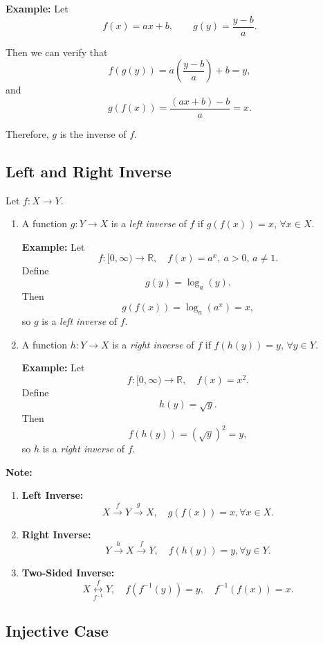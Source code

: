 \documentclass[12pt,a4paper,openany]{article}
\begin{document}
\textbf{Example:}  
Let
\[
f(x) = a x + b, \qquad g(y) = \frac{y - b}{a}.
\]

Then we can verify that
\[
f(g(y)) = a \left( \frac{y - b}{a} \right) + b = y,
\]
and
\[
g(f(x)) = \frac{(a x + b) - b}{a} = x.
\]

Therefore, $g$ is the inverse of $f$.

\subsection{Left and Right Inverse}

Let $f : X \to Y$.

\begin{enumerate}
    \item A function $g : Y \to X$ is a \emph{left inverse} of $f$ if $g(f(x)) = x$, $\forall x \in X$.

    \textbf{Example:}  
    Let
    \[
    f: [0, \infty) \to \mathbb{R}, \quad f(x) = a^x, \ a > 0,\, a \neq 1.
    \]
    Define 
    \[
    g(y) = \log_a(y).
    \]
    Then
    \[
    g(f(x)) = \log_a(a^x) = x,
    \]
    so $g$ is a \emph{left inverse} of $f$.

    \item A function $h : Y \to X$ is a \emph{right inverse} of $f$ if $f(h(y)) = y$, $\forall y \in Y$.

    \textbf{Example:}  
    Let
    \[
    f: [0, \infty) \to \mathbb{R}, \quad f(x) = x^2.
    \]
    Define
    \[
    h(y) = \sqrt{y}.
    \]
    Then
    \[
    f(h(y)) = (\sqrt{y})^2 = y,
    \]
    so $h$ is a \emph{right inverse} of $f$.
\end{enumerate}

\textbf{Note:}

\begin{enumerate}
    \item \textbf{Left Inverse:}
    \[
    X \xrightarrow{\,f\,} Y \xrightarrow{\,g\,} X, \quad g(f(x)) = x, \forall x \in X.
    \]

    \item \textbf{Right Inverse:}
    \[
    Y \xrightarrow{\,h\,} X \xrightarrow{\,f\,} Y, \quad f(h(y)) = y, \forall y \in Y.
    \]

    \item \textbf{Two-Sided Inverse:}
    \[
    X \overset{f}{\underset{f^{-1}}{\longleftrightarrow}} Y, \quad f(f^{-1}(y)) = y, \quad f^{-1}(f(x)) = x.
    \]
\end{enumerate}

\subsection{Injective Case}
\end{document}
